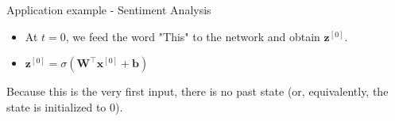 \begin{frame} {Application example - Sentiment Analysis}
  \begin{itemize}
    \item At $t = 0$, we feed the word "This" to the network and obtain $\bm{z}^{[0]}$.
    \item $\bm{z}^{[0]} = \sigma(\bm{W}^\top \bm{x}^{[0]} + \bm{b})$
  \end{itemize}
  \begin{figure}
      \centering
  \end{figure}
  Because this is the very first input, there is no past state (or, equivalently, the state is initialized to 0).
\end{frame}

